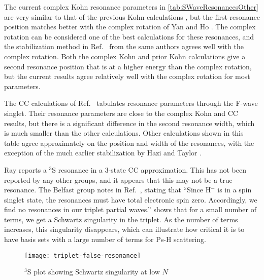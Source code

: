 \documentclass[Dissertation.tex]{subfiles}
\begin{document}
The current complex Kohn resonance parameters in
\cref{tab:SWaveResonancesOther} are very similar to that of the previous Kohn 
calculations \cite{VanReeth2004}, but the first resonance position matches 
better with the complex rotation of Yan and Ho \cite{Yan1999}. The complex
rotation can be considered one of the best calculations for these 
resonances, and the stabilization method in Ref.~\cite{Yan2003} from the same 
authors agrees well with the complex rotation. Both the complex Kohn and 
prior Kohn calculations give a second resonance position that is at a higher 
energy than the complex rotation, but the current results agree relatively 
well with the complex rotation for most parameters.

The CC calculations of Ref.~\cite{Walters2004} tabulates resonance parameters 
through the F-wave singlet. Their resonance parameters are close to the 
complex Kohn and CC results, but there is a significant difference in the 
second resonance width, which is much smaller than the other calculations. 
Other calculations shown in this table agree approximately on the position 
and width of the resonances, with the exception of the much earlier 
stabilization by Hazi and Taylor \cite{Hazi1970}.


Ray \cite{Ray2006} reports a $^3$S resonance in a 3-state CC approximation. 
This has not been reported by any other groups, and it appears that this may 
not be a true resonance. The Belfast group notes in Ref.~\cite{Campbell1998}, 
stating that ``Since H$^-$ is in a spin singlet state, the resonances must 
have total electronic spin zero. Accordingly, we find no resonances in our 
triplet partial waves.''  shows that for a 
small number of terms, we get a Schwartz singularity in the triplet. As the 
number of terms increases, this singularity disappears, which can illustrate 
how critical it is to have basis sets with a large number of terms for Ps-H 
scattering.


\begin{figure}
	\centering
	\texttt{[image: triplet-false-resonance]}
	\caption{$^3$S plot showing Schwartz singularity at low $N$}
	\label{fig:triplet-false-resonance}
\end{figure}
\end{document}
